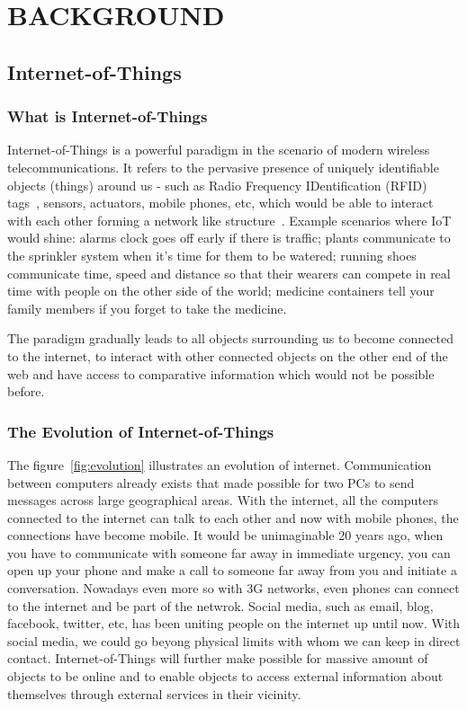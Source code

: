 \cleardoublepage
\singlespacing
\chapter{BACKGROUND}
\label{c:background}
\doublespacing\nointerlineskip

\section{Internet-of-Things}

\subsection{What is Internet-of-Things}

Internet-of-Things is a powerful paradigm in the scenario of modern wireless
telecommunications. It refers to the pervasive presence of uniquely identifiable
objects (things) around us - such as Radio Frequency IDentification (RFID)
tags~\cite{Shepard2005}, sensors, actuators, mobile phones, etc, which would be
able to interact with each other forming a network like
structure~\cite{Atzori20102787}. Example scenarios where IoT would shine: alarms
clock goes off early if there is traffic; plants communicate to the sprinkler
system when it's time for them to be watered; running shoes communicate time,
speed and distance so that their wearers can compete in real time with people on
the other side of the world; medicine containers tell your family members if you
forget to take the medicine.

The paradigm gradually leads to all objects surrounding us to become connected
to the internet, to interact with other connected objects on the other end of
the web and have access to comparative information which would not be possible
before.

\subsection{The Evolution of Internet-of-Things}

The figure~\ref{fig:evolution} illustrates an evolution of internet.
Communication between computers already exists that made possible for two PCs to
send messages across large geographical areas. With the internet, all the
computers connected to the internet can talk to each other and now with mobile
phones, the connections have become mobile.
It would be unimaginable 20 years ago, when you have to communicate with someone
far away in immediate urgency, you can open up your phone and make a call to
someone far away from you and initiate a conversation. Nowadays even more so
with 3G networks, even phones can connect to the internet and be part of the
netwrok.
Social media, such as email, blog, facebook, twitter, etc, has been uniting
people on the internet up until now. With social media, we could go beyong
physical limits with whom we can keep in direct contact. Internet-of-Things will
further make possible for massive amount of objects to be online and to enable
objects to access external information about themselves through external
services in their vicinity.~\cite{Associati2011a}

